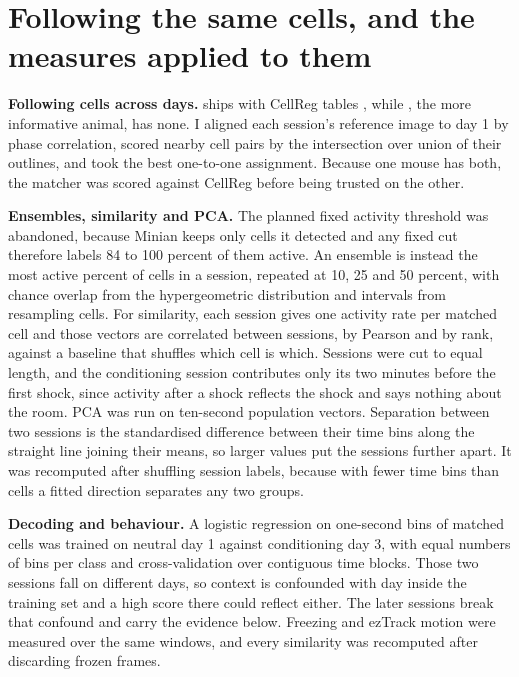 \documentclass[11pt,a4paper]{article}
\begin{document}
\section{Following the same cells, and the measures applied to them}

\textbf{Following cells across days.} \numDatasetStrongShockMouse{} ships with CellReg tables
\citep{sheintuch2017}, while \numDatasetWeakShockMouse{}, the more informative animal, has
none. I aligned each session's reference image to day 1 by phase correlation, scored nearby cell
pairs by the intersection over union of their outlines, and took the best one-to-one assignment.
Because one mouse has both, the matcher was scored against CellReg before being trusted on the
other.

\textbf{Ensembles, similarity and PCA.} The planned fixed activity threshold was abandoned,
because Minian keeps only cells it detected and any fixed cut therefore labels 84 to 100 percent
of them active. An ensemble is instead the most active \numOverlapEnsemblePercent{} percent of
cells in a session, repeated at 10, 25 and 50 percent, with chance overlap from the
hypergeometric distribution and intervals from resampling cells. For similarity, each session
gives one activity rate per matched cell and those vectors are correlated between sessions, by
Pearson and by rank, against a baseline that shuffles which cell is which. Sessions were cut to
equal length, and the conditioning session contributes only its two minutes before the first
shock, since activity after a shock reflects the shock and says nothing about the room. PCA was
run on ten-second population vectors. Separation between two sessions is the standardised
difference between their time bins along the straight line joining their means, so larger values
put the sessions further apart. It was recomputed after shuffling session labels, because with
fewer time bins than cells a fitted direction separates any two groups.

\textbf{Decoding and behaviour.} A logistic regression on one-second bins of matched cells was
trained on neutral day 1 against conditioning day 3, with equal numbers of bins per class and
cross-validation over contiguous time blocks. Those two sessions fall on different days, so
context is confounded with day inside the training set and a high score there could reflect
either. The later sessions break that confound and carry the evidence below. Freezing and
ezTrack motion were measured over the same windows, and every similarity was recomputed after
discarding frozen frames.
\end{document}
